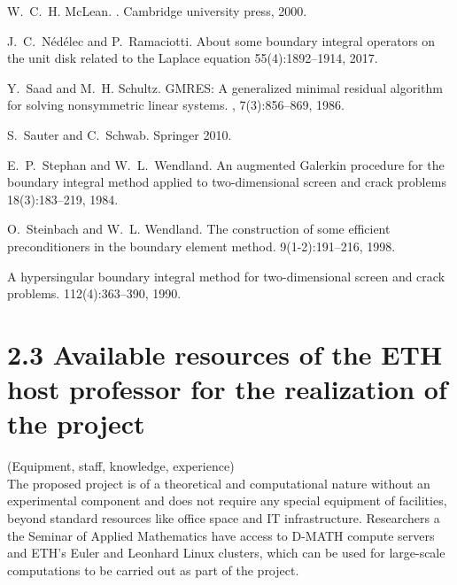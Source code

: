 \documentclass[]{report}
\begin{document}
\begin{small}
\begin{thebibliography}{0}
		
		W.~C.~H. McLean.
		.
		\newblock Cambridge university press, 2000.
		
		J.~C.~Nédélec and P.~Ramaciotti.
		\newblock About some boundary integral operators on the unit disk related to the Laplace equation
		 55(4):1892--1914, 2017.
		
		
		Y.~Saad and M.~H. Schultz.
		\newblock GMRES: A generalized minimal residual algorithm for solving
		nonsymmetric linear systems.
		,
		7(3):856--869, 1986.
		
		S.~Sauter and C.~Schwab.
		\newblock Springer 2010.
		
		E.~P.~Stephan and W.~L.~Wendland.
		\newblock An augmented Galerkin procedure for the boundary integral method applied to two-dimensional screen and crack problems
		 18(3):183--219, 1984.
		
		
		O.~Steinbach and W.~L. Wendland.
		\newblock The construction of some efficient preconditioners in the boundary
		element method.
		 9(1-2):191--216, 1998.
		
		\newblock A hypersingular boundary integral method for two-dimensional screen and crack problems.
		 112(4):363--390, 1990.
		

		
		
	\end{thebibliography}
\end{small}

\section*{2.3 Available resources of the ETH host professor for the realization of the project}
(Equipment, staff, knowledge, experience)\\

The proposed project is of a theoretical and computational nature without an experimental component and does not require any special equipment of facilities, beyond standard resources like office space and IT infrastructure. Researchers a the Seminar of Applied Mathematics have access to D-MATH compute servers and ETH's Euler and Leonhard Linux clusters, which can be used for large-scale computations to be carried out as part of the project.
\end{document}
